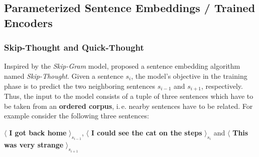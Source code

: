 \subsection{Parameterized Sentence Embeddings / Trained Encoders}
\label{sec:sent_embs_param}

\subsubsection{Skip-Thought and Quick-Thought}
\label{sec:skipthought}

 Inspired by the \textit{Skip-Gram} model, \citep{Kiros.2015} proposed a sentence embedding algorithm named \textit{Skip-Thought}. Given a sentence $s_i$, the model's objective in the training phase is to predict the two neighboring sentences $s_{i-1}$ and $s_{i+1}$, respectively. Thus, the input to the model consists of a tuple of three sentences which have to be taken from an \textbf{ordered corpus}, i.\,e. nearby sentences have to be related. For example consider the following three sentences:

\begin{center}
	\colorbox{lightgray!15}{$\langle$ \textbf{I got back home} $\rangle_{s_{i-1}}$},
	\colorbox{tud9c!15}{$\langle$ \textbf{I could see the cat on the steps} $\rangle_{s_i}$} and
	\colorbox{lightgray!15}{$\langle$ \textbf{This was very strange} $\rangle_{s_{i+1}}$}
\end{center}

